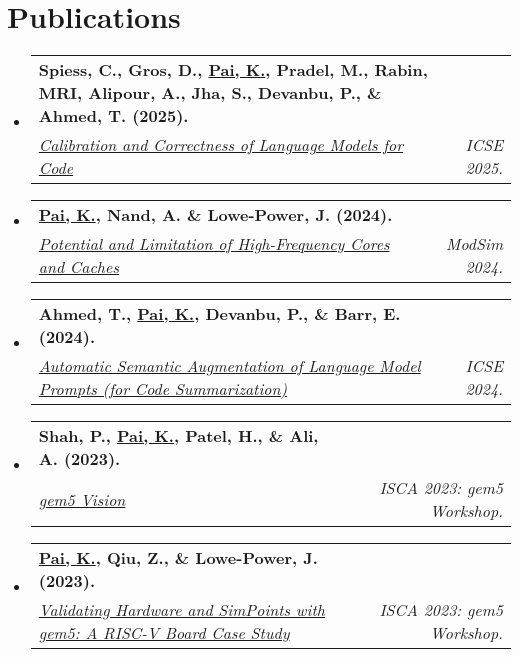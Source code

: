 \documentclass[letterpaper,10pt]{article}
\makeatletter
\newcommand{\resumeSubheading}[4]{
\vspace{-1pt}\item
  \begin{tabular*}{0.97\textwidth}[t]{l@{\extracolsep{\fill}}r}
    \textbf{#1} & #2 \\
    \textit{#3} & \textit{#4} \\
  \end{tabular*}\vspace{-7pt}
}
\newcommand{\resumeSubHeadingList}{\begin{itemize}[leftmargin=0.15in, label={}]}
\newcommand{\resumeSubHeadingListEnd}{\end{itemize}}
\makeatother
\begin{document}
\section{Publications}
\resumeSubHeadingList
  \resumeSubheading
      {Spiess, C., Gros, D., \underline{Pai, K.}, Pradel, M., Rabin, MRI, Alipour, A., Jha, S., Devanbu, P., \& Ahmed, T. (2025).}{}
      {\href{https://arxiv.org/pdf/2402.02047}{Calibration and Correctness of Language Models for Code}}{ICSE 2025.}
  \resumeSubheading
      {\underline{Pai, K.}, Nand, A. \& Lowe-Power, J. (2024).}{}
      {\href{}{Potential and Limitation of High-Frequency Cores and Caches}}{ModSim 2024.}
  \resumeSubheading
      {Ahmed, T., \underline{Pai, K.}, Devanbu, P., \& Barr, E. (2024).}{}
      {\href{https://dl.acm.org/doi/pdf/10.1145/3597503.3639183}{Automatic Semantic Augmentation of Language Model Prompts (for Code Summarization)}}{ICSE 2024.}
  \resumeSubheading
      {Shah, P., \underline{Pai, K.}, Patel, H., \& Ali, A. (2023).}{}
      {\href{https://www.gem5.org/assets/files/workshop-isca-2023/posters/gem5-vision-poster.pdf}{gem5 Vision}}{ISCA 2023: gem5 Workshop.}
  \resumeSubheading
      {\underline{Pai, K.}, Qiu, Z., \& Lowe-Power, J. (2023).}{}
      {\href{https://www.gem5.org/assets/files/workshop-isca-2023/posters/validating-hardware-and-simpoints-with-gem5-poster.pdf}{Validating Hardware and SimPoints with gem5: A RISC-V Board Case Study}}{ISCA 2023: gem5 Workshop.}
\resumeSubHeadingListEnd
\end{document}
